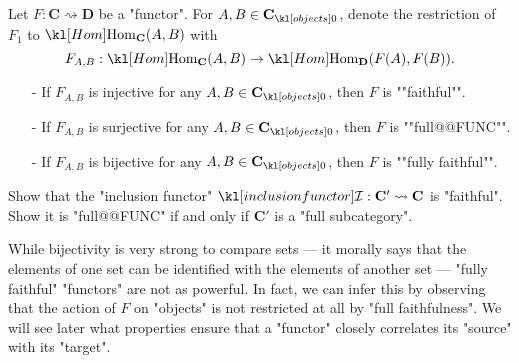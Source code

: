 \documentclass[main.tex]{subfiles}
\begin{document}
\begin{defn}
	Let $F:\mathbf{C} \rightsquigarrow \mathbf{D}$ be a "functor". For $A,B \in \obj{\mathbf{C}}$, denote the restriction of $F_1$ to $\Hom_{\mathbf{C}}(A,B)$ with \[F_{A,B}:\Hom_{\mathbf{C}}(A,B) \rightarrow \Hom_{\mathbf{D}}(F(A), F(B)).\]
	\begin{itemize}
		\item[-] If $F_{A,B}$ is injective for any $A,B \in \obj{\mathbf{C}}$, then $F$ is ""faithful"".
		\item[-] If $F_{A,B}$ is surjective for any $A,B \in \obj{\mathbf{C}}$, then $F$ is ""full@@FUNC"".
		\item[-] If $F_{A,B}$ is bijective for any $A,B \in \obj{\mathbf{C}}$, then $F$ is ""fully faithful"".
	\end{itemize}    
\end{defn}
\begin{exer}\label{exer:catfunc:inclusionfaithfull}
	Show that the "inclusion functor" $\inclF: \mathbf{C}' \rightsquigarrow \mathbf{C}$ is "faithful". Show it is "full@@FUNC" if and only if $\mathbf{C}'$ is a "full subcategory".
\end{exer}
\begin{rem}
While bijectivity is very strong to compare sets --- it morally says that the elements of one set can be identified with the elements of another set --- "fully faithful" "functors" are not as powerful. In fact, we can infer this by observing that the action of $F$ on "objects" is not restricted at all by "full faithfulness". We will see later what properties ensure that a "functor" closely correlates its "source" with its "target".
\end{rem}
\end{document}
